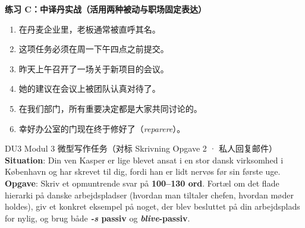\textbf{练习 C：中译丹实战（活用两种被动与职场固定表达）}
\begin{enumerate}
  \item 在丹麦企业里，老板通常被直呼其名。
  \item 这项任务必须在周一下午四点之前提交。
  \item 昨天上午召开了一场关于新项目的会议。
  \item 她的建议在会议上被团队认真对待了。
  \item 在我们部门，所有重要决定都是大家共同讨论的。
  \item 幸好办公室的门现在终于修好了（\textit{reparere}）。
\end{enumerate}


\begin{emailbox}{DU3 Modul 3 微型写作任务（对标 Skrivning Opgave 2 · 私人回复邮件）}
\textbf{Situation}: Din ven Kasper er lige blevet ansat i en stor dansk virksomhed i København og har skrevet til dig, fordi han er lidt nervøs før sin første uge.\\
\textbf{Opgave}: Skriv et opmuntrende svar på \textbf{100--130 ord}. Fortæl om det flade hierarki på danske arbejdspladser (hvordan man tiltaler chefen, hvordan møder holdes), giv et konkret eksempel på noget, der blev besluttet på din arbejdsplads for nylig, og brug både \textbf{\textit{-s} passiv} og \textbf{\textit{blive}-passiv}.
\end{emailbox}

